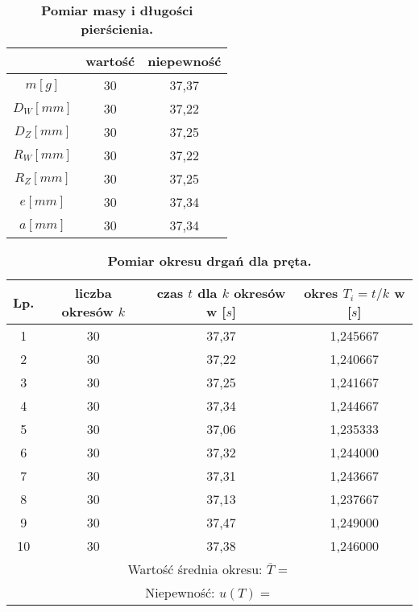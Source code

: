 \documentclass[a4paper,11pt]{article}
\begin{document}
\begin{table}[ht]
\centering
\setlength{\extrarowheight}{2pt}
\caption{\textbf{Pomiar masy i długości pierścienia.}}
\begin{tabular}{| @{\hspace{8mm}}c @{\hspace{8mm}}| @{\hspace{8mm}}c @{\hspace{8mm}}|@{\hspace{8mm}} c@{\hspace{8mm}}|}
\hline
 & wartość & niepewność  \\ \hline
$m[g]$ & 30 & 37,37 \\ \hline
$D_{W}[mm]$ & 30 & 37,22 \\ \hline
$D_{Z}[mm]$ & 30 & 37,25 \\ \hline
$R_{W}[mm]$ & 30 & 37,22 \\ \hline
$R_{Z}[mm]$ & 30 & 37,25 \\ \hline
$e[mm]$ & 30 & 37,34 \\ \hline
$a[mm]$ & 30 & 37,34 \\ \hline

\end{tabular}
\end{table}

\begin{table}[ht]
\centering
\setlength{\extrarowheight}{2pt}
\caption{\textbf{Pomiar okresu drgań dla pręta.}}
\begin{tabular}{|c|c|c|c|}
\hline
Lp. & liczba okresów $k$ & czas $t$ dla $k$ okresów w [$s$] & okres $T_{i}=t/k$ w [$s$] \\ \hline
1 & 30 & 37,37 & 1,245667\\ \hline
2 & 30 & 37,22 & 1,240667\\ \hline
3 & 30 & 37,25 & 1,241667\\ \hline
4 & 30 & 37,34 & 1,244667\\ \hline
5 & 30 & 37,06 & 1,235333\\ \hline
6 & 30 & 37,32 & 1,244000\\ \hline
7 & 30 & 37,31 & 1,243667\\ \hline
8 & 30 & 37,13 & 1,237667\\ \hline
9 & 30 & 37,47 & 1,249000\\ \hline
10 & 30 & 37,38 & 1,246000\\ \hline
\multicolumn{4}{|c|}{Wartość średnia okresu: $\overline{T}= $} \\ \hline
\multicolumn{4}{|c|}{Niepewność: $u(T)=$} \\ \hline
\end{tabular}
\end{table}
\end{document}
